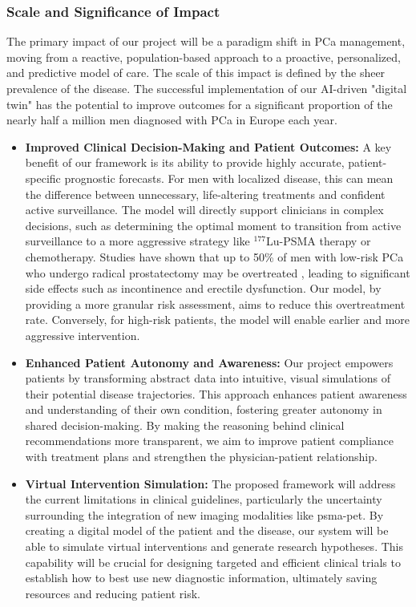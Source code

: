 \documentclass[11pt, a4paper]{article}
\begin{document}
\subsubsection{Scale and Significance of Impact}

The primary impact of our project will be a paradigm shift in PCa management, moving from a reactive, population-based approach to a proactive, personalized, and predictive model of care. The scale of this impact is defined by the sheer prevalence of the disease. The successful implementation of our AI-driven "digital twin" has the potential to improve outcomes for a significant proportion of the nearly half a million men diagnosed with PCa in Europe each year.

\begin{itemize}

    \item \textbf{Improved Clinical Decision-Making and Patient Outcomes:} A key benefit of our framework is its ability to provide highly accurate, patient-specific prognostic forecasts. For men with localized disease, this can mean the difference between unnecessary, life-altering treatments and confident active surveillance. The model will directly support clinicians in complex decisions, such as determining the optimal moment to transition from active surveillance to a more aggressive strategy like $^{177}$Lu-PSMA therapy or chemotherapy. Studies have shown that up to 50\% of men with low-risk PCa who undergo radical prostatectomy may be overtreated \cite{HeijnsdijkWever2012}, leading to significant side effects such as incontinence and erectile dysfunction. Our model, by providing a more granular risk assessment, aims to reduce this overtreatment rate. Conversely, for high-risk patients, the model will enable earlier and more aggressive intervention.


    \item \textbf{Enhanced Patient Autonomy and Awareness:} Our project empowers patients by transforming abstract data into intuitive, visual simulations of their potential disease trajectories. This approach enhances patient awareness and understanding of their own condition, fostering greater autonomy in shared decision-making. By making the reasoning behind clinical recommendations more transparent, we aim to improve patient compliance with treatment plans and strengthen the physician-patient relationship.


\item \textbf{Virtual Intervention Simulation:} The proposed framework will address the current limitations in clinical guidelines, particularly the uncertainty surrounding the integration of new imaging modalities like \gls{psma}-\gls{pet}. By creating a digital model of the patient and the disease, our system will be able to simulate virtual interventions and generate research hypotheses. This capability will be crucial for designing targeted and efficient clinical trials to establish how to best use new diagnostic information, ultimately saving resources and reducing patient risk.


\end{itemize}
\end{document}
